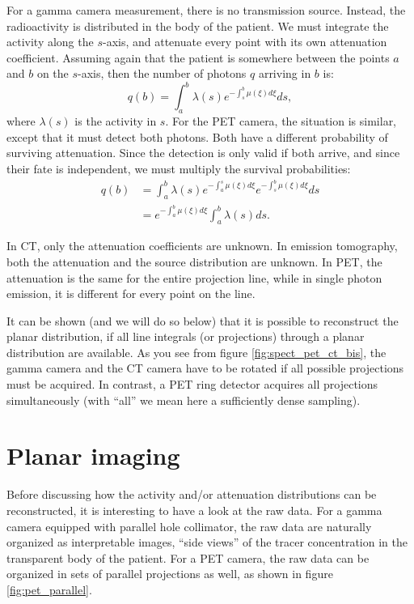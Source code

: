 \documentclass[11pt,oneside]{book}
\begin{document}
For a gamma camera measurement, there is no transmission source. Instead, the
radioactivity is distributed in the body of the patient. We must integrate the
activity along the $s$-axis, and attenuate every point with its own
attenuation coefficient. Assuming again that the patient is somewhere between
the points $a$ and $b$ on the $s$-axis, then the number of photons $q$ arriving
in $b$ is:
\begin{equation}
  q(b) = \int_a^b \lambda(s) e^{- \int_s^b \mu(\xi) d\xi} ds,
   \label{eq:spect_proj}
\end{equation}
where $\lambda(s)$ is the activity in $s$.
For the PET camera, the situation is similar, except that it must detect both
photons. Both have a different probability of surviving attenuation. Since the
detection is only valid if both arrive, and since their fate is independent,
we must multiply the survival probabilities:
\begin{align}
  q(b) &= \int_a^b \lambda(s) e^{- \int_a^s \mu(\xi) d\xi} 
                             e^{- \int_s^b \mu(\xi) d\xi} ds \\
  &= e^{- \int_a^b \mu(\xi) d\xi} \int_a^b \lambda(s) ds.
        \label{eq:pet_proj}
\end{align}

In CT, only the attenuation coefficients are unknown. In emission tomography,
both the attenuation and the source distribution are unknown. In PET, the
attenuation is the same for the entire projection line, while in single photon
emission, it is different for every point on the line.

It can be shown (and we will do so below) that it is possible to reconstruct
the planar distribution, if all line integrals (or projections) through a
planar distribution are available. As you see from figure
\ref{fig:spect_pet_ct_bis}, the gamma camera and the CT camera have to be
rotated if all possible projections must be acquired. In contrast, a PET ring
detector acquires all projections simultaneously (with ``all'' we mean here a
sufficiently dense sampling).

\section{Planar imaging}
Before discussing how the activity and/or attenuation distributions can be
reconstructed, it is interesting to have a look at the raw data. For a gamma
camera equipped with parallel hole collimator, the raw data are naturally
organized as interpretable images, ``side views'' of the tracer concentration
in the transparent body of the patient. For a PET camera, the raw data can be
organized in sets of parallel projections as well, as shown in figure
\ref{fig:pet_parallel}. 
\end{document}
